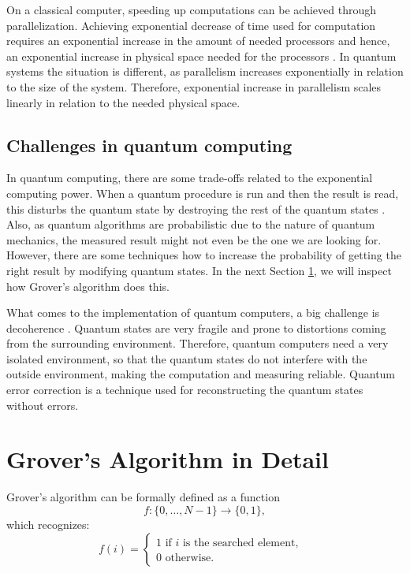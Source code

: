 \documentclass[english,oneside,openright]{UH_DS_report}
\begin{document}
On a classical computer, speeding up computations can be achieved through parallelization. Achieving exponential decrease of time used for computation requires an exponential increase in the amount of needed processors and hence, an exponential increase in physical space needed for the processors \cite{introtoqc}. In quantum systems the situation is different, as parallelism increases exponentially in relation to the size of the system. Therefore, exponential increase in parallelism scales linearly in relation to the needed physical space.

\subsection{Challenges in quantum computing}
In quantum computing, there are some trade-offs related to the exponential computing power. When a quantum procedure is run and then the result is read, this disturbs the quantum state by destroying the rest of the quantum states \cite{introtoqc}. Also, as quantum algorithms are probabilistic due to the nature of quantum mechanics, the measured result might not even be the one we are looking for. However, there are some techniques how to increase the probability of getting the right result by modifying quantum states. In the next Section \ref{detailedgrover}, we will inspect how Grover's algorithm does this.

What comes to the implementation of quantum computers, a big challenge is decoherence \cite{introtoqc}. Quantum states are very fragile and prone to distortions coming from the surrounding environment. Therefore, quantum computers need a very isolated environment, so that the quantum states do not interfere with the outside environment, making the computation and measuring reliable. Quantum error correction is a technique used for reconstructing the quantum states without errors.

\section{Grover's Algorithm in Detail}
\label{detailedgrover}

Grover's algorithm can be formally defined as a function \cite{lavor2003grover}
\begin{equation}
    f : \{ 0, \ldots, N - 1 \} \rightarrow \{0, 1\},
\end{equation}
which recognizes:
\begin{equation}    
f(i) = 
\begin{cases}
    1 \textrm{ if $i$ is the searched element,} & \\ 0 \textrm{ otherwise.}
\end{cases}
\end{equation}
\end{document}
